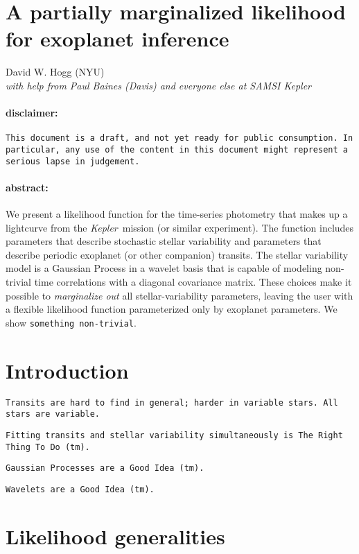 \documentclass[12pt,letterpaper]{article}
\newcommand{\warning}[1]{\texttt{#1}}
\newcommand{\project}[1]{\textsl{#1}}
\newcommand{\Kepler}{\project{Kepler}}
\begin{document}
\sloppy\sloppypar

\section*{A partially marginalized likelihood for exoplanet inference}

\noindent
David W. Hogg (NYU) \\
\textit{with help from Paul Baines (Davis) and everyone else at SAMSI \Kepler}

\paragraph{disclaimer:}
\warning{This document is a draft, and not yet ready for public consumption.
In particular, any use of the content in this document might represent a serious lapse in judgement.}

\paragraph{abstract:}
We present a likelihood function for the time-series photometry
that makes up a lightcurve from the \Kepler\ mission (or similar experiment).
The function includes parameters that describe stochastic stellar variability
and parameters that describe periodic exoplanet (or other companion) transits.
The stellar variability model is a Gaussian Process in a wavelet basis
that is capable of modeling non-trivial time correlations with a diagonal covariance matrix.
These choices make it possible to \emph{marginalize out} all stellar-variability parameters,
leaving the user with a flexible likelihood function parameterized only by exoplanet parameters.
We show \warning{something non-trivial}.

\section{Introduction}

\warning{Transits are hard to find in general; harder in variable stars.  All stars are variable.}

\warning{Fitting transits and stellar variability simultaneously is The Right Thing To Do~(tm).}

\warning{Gaussian Processes are a Good Idea~(tm).}

\warning{Wavelets are a Good Idea~(tm).}

\section{Likelihood generalities}
\end{document}
